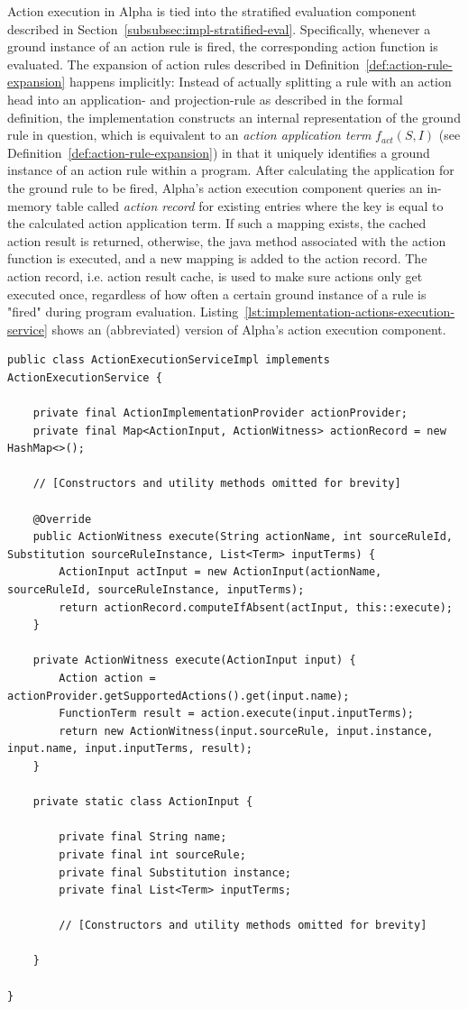 Action execution in Alpha is tied into the stratified evaluation component described in Section~\ref{subsubsec:impl-stratified-eval}. Specifically, whenever a ground instance of an action rule is fired, the corresponding action function is evaluated. The expansion of action rules described in Definition~\ref{def:action-rule-expansion} happens implicitly:
Instead of actually splitting a rule with an action head into an application- and projection-rule as described in the formal definition, the implementation constructs an internal representation of the ground rule in question, which is equivalent to an \emph{action application term} $f_{act}(S, I)$ (see Definition~\ref{def:action-rule-expansion}) in that it uniquely identifies a ground instance of an action rule within a program. After calculating the application for the ground rule to be fired, Alpha's action execution component queries an in-memory table called \emph{action record} for existing entries where the key is equal to the calculated action application term. If such a mapping exists, the cached action result is returned, otherwise, the java method associated with the action function is executed, and a new mapping is added to the action record. The action record, i.e. action result cache, is used to make sure actions only get executed once, regardless of how often a certain ground instance of a rule is "fired" during program evaluation. Listing~\ref{lst:implementation-actions-execution-service} shows an (abbreviated) version of Alpha's action execution component.

\begin{lstlisting}[style=java, label={lst:implementation-actions-execution-service}, caption={Alpha's action execution logic}]
public class ActionExecutionServiceImpl implements ActionExecutionService {

	private final ActionImplementationProvider actionProvider;
	private final Map<ActionInput, ActionWitness> actionRecord = new HashMap<>();

	// [Constructors and utility methods omitted for brevity]

	@Override
	public ActionWitness execute(String actionName, int sourceRuleId, Substitution sourceRuleInstance, List<Term> inputTerms) {
		ActionInput actInput = new ActionInput(actionName, sourceRuleId, sourceRuleInstance, inputTerms);
		return actionRecord.computeIfAbsent(actInput, this::execute);
	}

	private ActionWitness execute(ActionInput input) {
		Action action = actionProvider.getSupportedActions().get(input.name);
		FunctionTerm result = action.execute(input.inputTerms);
		return new ActionWitness(input.sourceRule, input.instance, input.name, input.inputTerms, result);
	}

	private static class ActionInput {

		private final String name;
		private final int sourceRule;
		private final Substitution instance;
		private final List<Term> inputTerms;

        // [Constructors and utility methods omitted for brevity]

	}

}
\end{lstlisting}    


